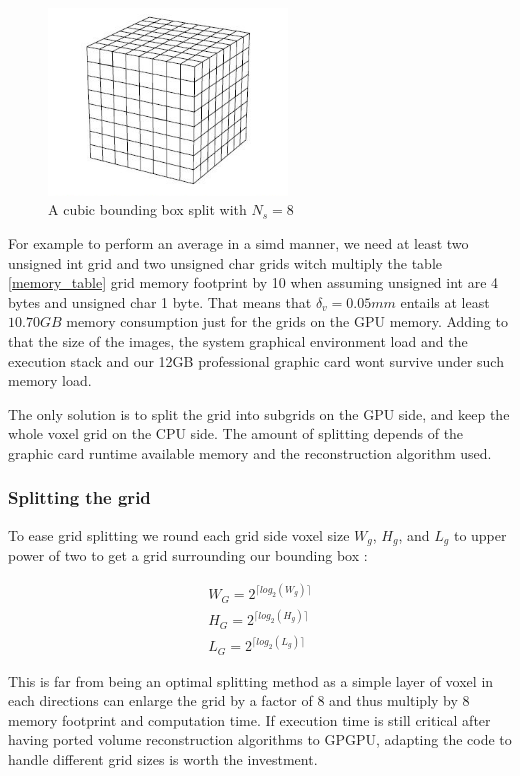 \documentclass[12pt,journal,compsoc]{IEEEtran}
\begin{document}
\begin{figure}[!ht]
\centering
\includegraphics[width=2.5in]{grid}
\caption{A cubic bounding box split with $N_s=8$}
\label{grid}
\end{figure}

For example to perform an average in a \acl{simd} manner, we need at least two unsigned int grid and two unsigned char grids witch multiply the table \ref{memory_table} grid memory footprint by 10 when assuming unsigned int are 4 bytes and unsigned char 1 byte.
That means that $\delta_v=0.05mm$ entails at least $10.70GB$ memory consumption just for the grids on the GPU memory.
Adding to that the size of the images, the system graphical environment load and the execution stack and our 12GB professional graphic card wont survive under such memory load.

The only solution is to split the grid into subgrids on the GPU side, and keep the whole voxel grid on the CPU side. The amount of splitting depends of the graphic card runtime available memory and the reconstruction algorithm used.

\subsubsection{Splitting the grid}
To ease grid splitting we round each grid side voxel size $W_g$, $H_g$, and $L_g$ to upper power of two to get a grid surrounding our bounding box :

\begin{eqnarray}
	W_G = 2^{\lceil log_2(W_g) \rceil}\\
	H_G = 2^{\lceil log_2(H_g) \rceil}\\
	L_G = 2^{\lceil log_2(L_g) \rceil}
\end{eqnarray}


This is far from being an optimal splitting method as a simple layer of voxel in each directions can enlarge the grid by a factor of 8 and thus multiply by 8 memory footprint and computation time. 
If execution time is still critical after having ported volume reconstruction algorithms to GPGPU, adapting the code to handle different grid sizes is worth the investment.
\end{document}
